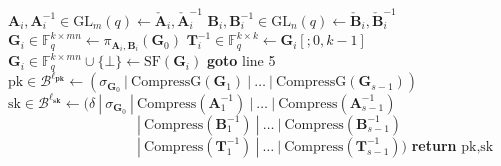\begin{algorithm}[H]
\begin{algorithmic}[1]
    \EndIf
    \State $\textbf{A}_i, \textbf{A}_i^{-1} \in \text{GL}_m(q) \gets \check{\textbf{A}}_i, \check{\textbf{A}}_i^{-1}$
    \State $\textbf{B}_i, \textbf{B}_i^{-1} \in \text{GL}_n(q) \gets \check{\textbf{B}}_i, \check{\textbf{B}}_i^{-1}$
    \State $\textbf{G}_i \in \mathds{F}_q^{k \times mn} \gets \pi_{\textbf{A}_i, \textbf{B}_i}(\textbf{G}_0)$
    \State $\textbf{T}_i^{-1} \in \mathds{F}_q^{k \times k} \gets \textbf{G}_i[;0,k-1]$
    \State $\textbf{G}_i \in \mathds{F}_q^{k \times mn} \cup \{\bot\} \gets \text{SF}(\textbf{G}_i)$
        \State \textbf{goto} line 5
    \EndIf
    \EndFor
\State $\text{pk} \in \mathcal{B}^{\ell_\textbf{pk}} \gets (\sigma_{\textbf{G}_0}~|~\text{CompressG}(\textbf{G}_1)~|~\ldots~|~\text{CompressG}(\textbf{G}_{s-1}))$
\State $\text{sk} \in \mathcal{B}^{\ell_\textbf{sk}} \gets (\delta~|~\sigma_{\textbf{G}_0}~|~\text{Compress}(\textbf{A}_1^{-1})~|~\ldots~|~\text{Compress}(\textbf{A}_{s-1}^{-1})$\\
$\quad\quad\quad\quad\quad\quad\quad\quad\quad~|~\text{Compress}(\textbf{B}_1^{-1})~|~\ldots~|~\text{Compress}(\textbf{B}_{s-1}^{-1})$\\
$\quad\quad\quad\quad\quad\quad\quad\quad\quad~|~\text{Compress}(\textbf{T}_1^{-1})~|~\ldots~|~\text{Compress}(\textbf{T}_{s-1}^{-1}))$
\State \textbf{return} $\text{pk}, \text{sk}$
\end{algorithmic}
\end{algorithm}

\newpage

